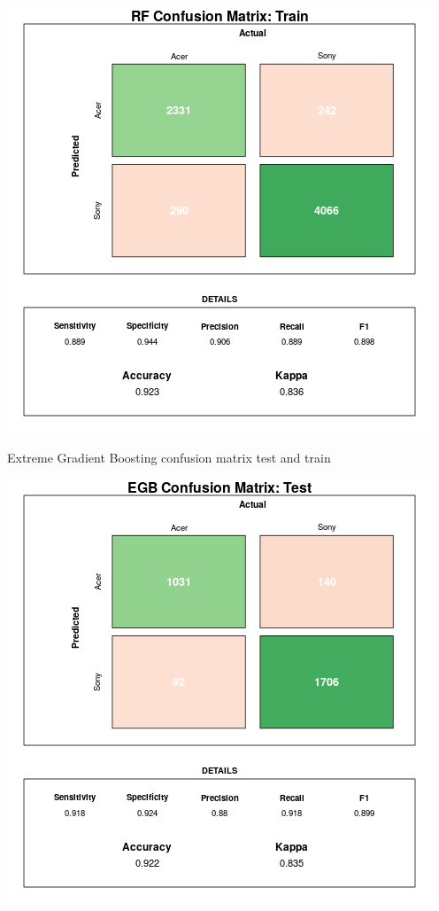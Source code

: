 \documentclass[12pt,a4paper,leqno]{report}
\theoremstyle{plain}
\theoremstyle{definition}
\theoremstyle{remark}
\begin{document}
\bigskip
{
    \centering
    \includegraphics[width=\textwidth,height=\textheight,keepaspectratio]{cm_rf_train.png}
    \par
}
\bigskip

Extreme Gradient Boosting confusion matrix test and train

\bigskip
{
    \centering
    \includegraphics[width=\textwidth,height=\textheight,keepaspectratio]{cm_egb.png}
    \par
}
\bigskip
\end{document}
